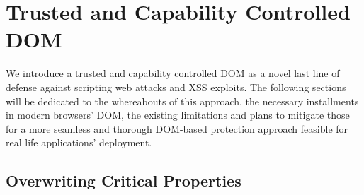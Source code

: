 % 
% 
% 
% 
% 

  \section{Trusted and Capability Controlled DOM}
  \label{subsec:6.6.trusted_and_capability_controlled_dom}

     We introduce a trusted and capability controlled DOM as a novel last line of defense against scripting web attacks and XSS exploits. The following sections will be dedicated to the whereabouts of this approach, the necessary installments in modern browsers' DOM, the existing limitations and plans to mitigate those for a more seamless and thorough DOM-based protection approach feasible for real life applications' deployment.

    \subsection{Overwriting Critical Properties}
    \label{subsubsec:6.6.4.overwriting_critical_properties}

